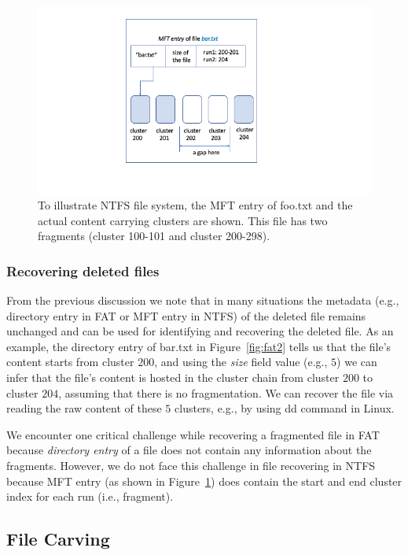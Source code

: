  \begin{figure}[h]
     \centering
     \includegraphics[width=\linewidth]{fig/ntfs.png}
     \caption{To illustrate NTFS file system, the MFT entry of foo.txt and the actual content carrying clusters are shown. 
 This file has two fragments (cluster 100-101 and cluster 200-298).}
     \label{fig:ntfs}
 \end{figure}
 

\subsubsection{Recovering deleted files}\label{subsubsec:meta-recovery}

From the previous discussion we note that in many situations the metadata
(e.g., directory entry in FAT or MFT entry in NTFS) of the deleted file remains
unchanged and can be used for identifying and recovering the deleted file.
As an example, the directory entry of bar.txt in Figure~\ref{fig:fat2} tells us
that the file's content starts from cluster $200$, 
and using the \emph{size} field value (e.g., $5$) we can infer that the file's content
is hosted in the cluster chain from cluster $200$ to cluster $204$, assuming that there is no
fragmentation. We can recover the file via reading the raw content of these $5$ clusters, e.g.,
by using dd command in Linux.  

We encounter one critical challenge while recovering a fragmented file in FAT because \emph{directory entry}
of a file does not contain any information about the fragments. However, we do not face this challenge 
in file recovering in NTFS because MFT entry (as shown in Figure~\ref{fig:ntfs}) does contain the start and end cluster index for each run (i.e., fragment). 

\subsection{File Carving}\label{subsec:file-carving}

